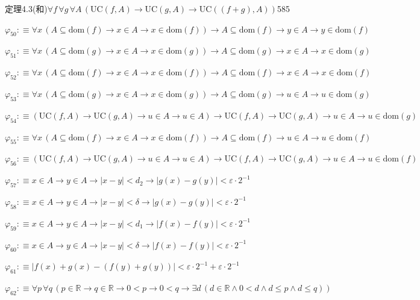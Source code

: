 \begin{fullproof}{定理4.3(和)}{$\forall f\,\forall g\,\forall A\,(\mathrm{UC}(f,A) \to \mathrm{UC}(g,A) \to \mathrm{UC}((f + g),A))$}{585}
\begin{abbrevlist}
\item $\varphi_{50} :\equiv \forall x\,(A \subseteq \mathrm{dom}(f) \to x \in A \to x \in \mathrm{dom}(f)) \to A \subseteq \mathrm{dom}(f) \to y \in A \to y \in \mathrm{dom}(f)$
\item $\varphi_{51} :\equiv \forall x\,(A \subseteq \mathrm{dom}(g) \to x \in A \to x \in \mathrm{dom}(g)) \to A \subseteq \mathrm{dom}(g) \to x \in A \to x \in \mathrm{dom}(g)$
\item $\varphi_{52} :\equiv \forall x\,(A \subseteq \mathrm{dom}(f) \to x \in A \to x \in \mathrm{dom}(f)) \to A \subseteq \mathrm{dom}(f) \to x \in A \to x \in \mathrm{dom}(f)$
\item $\varphi_{53} :\equiv \forall x\,(A \subseteq \mathrm{dom}(g) \to x \in A \to x \in \mathrm{dom}(g)) \to A \subseteq \mathrm{dom}(g) \to u \in A \to u \in \mathrm{dom}(g)$
\item $\varphi_{54} :\equiv (\mathrm{UC}(f,A) \to \mathrm{UC}(g,A) \to u \in A \to u \in A) \to \mathrm{UC}(f,A) \to \mathrm{UC}(g,A) \to u \in A \to u \in \mathrm{dom}(g)$
\item $\varphi_{55} :\equiv \forall x\,(A \subseteq \mathrm{dom}(f) \to x \in A \to x \in \mathrm{dom}(f)) \to A \subseteq \mathrm{dom}(f) \to u \in A \to u \in \mathrm{dom}(f)$
\item $\varphi_{56} :\equiv (\mathrm{UC}(f,A) \to \mathrm{UC}(g,A) \to u \in A \to u \in A) \to \mathrm{UC}(f,A) \to \mathrm{UC}(g,A) \to u \in A \to u \in \mathrm{dom}(f)$
\item $\varphi_{57} :\equiv x \in A \to y \in A \to \lvert x - y \rvert < d_{2} \to \lvert g(x) - g(y) \rvert < \varepsilon \cdot 2^{-1}$
\item $\varphi_{58} :\equiv x \in A \to y \in A \to \lvert x - y \rvert < \delta \to \lvert g(x) - g(y) \rvert < \varepsilon \cdot 2^{-1}$
\item $\varphi_{59} :\equiv x \in A \to y \in A \to \lvert x - y \rvert < d_{1} \to \lvert f(x) - f(y) \rvert < \varepsilon \cdot 2^{-1}$
\item $\varphi_{60} :\equiv x \in A \to y \in A \to \lvert x - y \rvert < \delta \to \lvert f(x) - f(y) \rvert < \varepsilon \cdot 2^{-1}$
\item $\varphi_{61} :\equiv \lvert f(x) + g(x) - (f(y) + g(y)) \rvert < \varepsilon \cdot 2^{-1} + \varepsilon \cdot 2^{-1}$
\item $\varphi_{62} :\equiv \forall p\,\forall q\,(p \in \mathbb{R} \to q \in \mathbb{R} \to 0 < p \to 0 < q \to \exists d\,(d \in \mathbb{R} \land 0 < d \land d \leq p \land d \leq q))$

\end{abbrevlist}
\end{fullproof}
